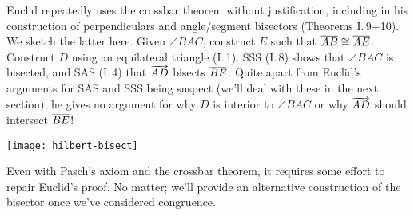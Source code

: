 

\begin{minipage}[t]{0.67\linewidth}\vspace{-8pt}
	Euclid repeatedly uses the crossbar theorem without justification, including in his construction of perpendiculars and angle/segment bisectors (Theorems I.\,9+10). We sketch the latter here.\smallbreak
	Given $\angle BAC$, construct $E$ such that $\overline{AB}\cong\overline{AE}$. Construct $D$ using an equilateral triangle (I.\,1). SSS (I.\,8) shows that $\angle BAC$ is bisected, and SAS (I.\,4) that $\overrightarrow{AD}$ bisects $\overline{BE}$.\smallbreak
	Quite apart from Euclid's arguments for SAS and SSS being suspect (we'll deal with these in the next section), he gives no argument for why $D$ is interior to $\angle BAC$ or why $\overrightarrow{AD}$ should intersect $\overline{BE}$!
\end{minipage}
\hfill
\begin{minipage}[t]{0.32\linewidth}\vspace{0pt}
	\flushright
	\texttt{[image: hilbert-bisect]}
\end{minipage}
\medbreak


Even with Pasch's axiom and the crossbar theorem, it requires some effort to repair Euclid's proof. No matter; we'll provide an alternative construction of the bisector once we've considered congruence.

\goodbreak


